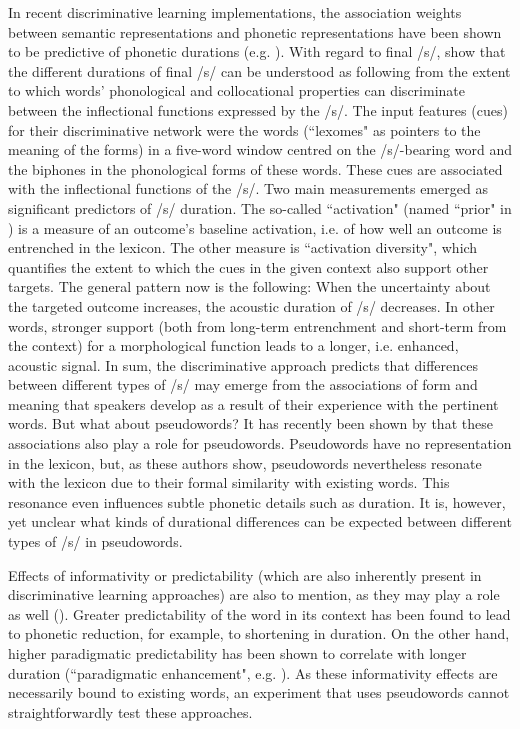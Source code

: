 In recent discriminative learning implementations, the association weights between semantic representations and phonetic representations have been shown to be predictive of phonetic durations (e.g. \cite{Stein2021}). With regard to final /s/, \citet{Tomaschek2019} show that the different durations of final /s/ can be understood as following from the extent to which words’ phonological and collocational properties can discriminate between the inflectional functions expressed by the /s/. The input features (cues) for their discriminative network were the words (``lexomes" as pointers to the meaning of the forms) in a five-word window centred on the /s/-bearing word and the biphones in the phonological forms of these words. These cues are associated with the inflectional functions of the /s/. Two main measurements emerged as significant predictors of /s/ duration. The so-called ``activation" (named ``prior" in \cite{Tomaschek2019}) is a measure of an outcome’s baseline activation, i.e. of how well an outcome is entrenched in the lexicon. The other measure is ``activation diversity", which quantifies the extent to which the cues in the given context also support other targets. The general pattern now is the following: When the uncertainty about the targeted outcome increases, the acoustic duration of /s/ decreases. In other words, stronger support (both from long-term entrenchment and short-term from the context) for a morphological function leads to a longer, i.e. enhanced, acoustic signal. 
In sum, the discriminative approach predicts that differences between different types of /s/ may emerge from the associations of form and meaning that speakers develop as a result of their experience with the pertinent words. But what about pseudowords?  It has recently been shown by \citet{Chuang2021} that these associations also play a role for pseudowords. Pseudowords have no representation in the lexicon, but, as these authors show, pseudowords nevertheless resonate with the lexicon due to their formal similarity with existing words. This resonance even influences subtle phonetic details such as duration. It is, however, yet unclear what kinds of durational differences can be expected between different types of /s/ in pseudowords.

Effects of informativity or predictability (which are also inherently present in discriminative learning approaches) are also to mention, as they may play a role as well (\cite{Seyfarth2014, Priva2015, Zee2021}). Greater predictability of the word in its context has been found to lead to phonetic reduction, for example, to shortening in duration. On the other hand, higher paradigmatic predictability has been shown to correlate with longer duration (``paradigmatic enhancement", e.g. \cite{Kuperman2007, Bell2021}). As these informativity effects are necessarily bound to existing words, an experiment that uses pseudowords cannot straightforwardly test these approaches. 

